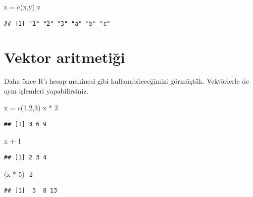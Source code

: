 \documentclass[
]{book}
\newenvironment{Shaded}{\begin{snugshade}}{\end{snugshade}}
\newcommand{\DecValTok}[1]{\textcolor[rgb]{0.00,0.00,0.81}{#1}}
\newcommand{\FunctionTok}[1]{\textcolor[rgb]{0.00,0.00,0.00}{#1}}
\newcommand{\NormalTok}[1]{#1}
\newcommand{\OtherTok}[1]{\textcolor[rgb]{0.56,0.35,0.01}{#1}}
\newcommand{\SpecialCharTok}[1]{\textcolor[rgb]{0.00,0.00,0.00}{#1}}
\begin{document}
\begin{Shaded}
\begin{Highlighting}[]
\NormalTok{z }\OtherTok{=} \FunctionTok{c}\NormalTok{(x,y)}
\NormalTok{z}
\end{Highlighting}
\end{Shaded}

\begin{verbatim}
## [1] "1" "2" "3" "a" "b" "c"
\end{verbatim}

\hypertarget{vektor-aritmetiux11fi}{%
\section{Vektor aritmetiği}\label{vektor-aritmetiux11fi}}

Daha önce R'ı hesap makinesi gibi kullanabileceğimizi görmüştük. Vektörlerle de aynı işlemleri yapabilirsiniz.

\begin{Shaded}
\begin{Highlighting}[]
\NormalTok{x }\OtherTok{=} \FunctionTok{c}\NormalTok{(}\DecValTok{1}\NormalTok{,}\DecValTok{2}\NormalTok{,}\DecValTok{3}\NormalTok{)}
\NormalTok{x }\SpecialCharTok{*} \DecValTok{3}
\end{Highlighting}
\end{Shaded}

\begin{verbatim}
## [1] 3 6 9
\end{verbatim}

\begin{Shaded}
\begin{Highlighting}[]
\NormalTok{x }\SpecialCharTok{+} \DecValTok{1}
\end{Highlighting}
\end{Shaded}

\begin{verbatim}
## [1] 2 3 4
\end{verbatim}

\begin{Shaded}
\begin{Highlighting}[]
\NormalTok{(x }\SpecialCharTok{*} \DecValTok{5}\NormalTok{) }\SpecialCharTok{{-}}\DecValTok{2}
\end{Highlighting}
\end{Shaded}

\begin{verbatim}
## [1]  3  8 13
\end{verbatim}
\end{document}
